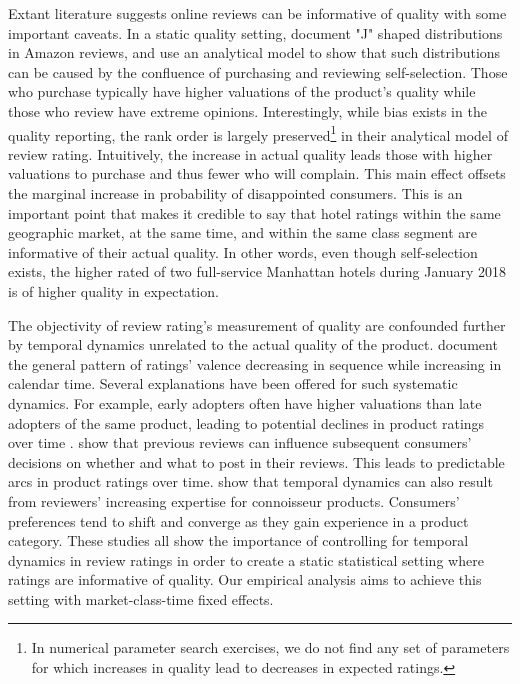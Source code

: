 \documentclass[mksc,blindrev]{informs3} %
\begin{document}
Extant literature suggests online reviews can be informative of quality with some important caveats. In a static quality setting, \citet{hu2006can} document "J" shaped distributions in Amazon reviews, and use an analytical model to show that such distributions can be caused by the confluence of purchasing and reviewing self-selection. Those who purchase typically have higher valuations of the product's quality while those who review have extreme opinions. Interestingly, while bias exists in the quality reporting, the rank order is largely preserved\footnote{In numerical parameter search exercises, we do not find any set of parameters for which increases in quality lead to decreases in expected ratings.} in their analytical model of review rating. Intuitively, the increase in actual quality leads those with higher valuations to purchase and thus fewer who will complain. This main effect offsets the marginal increase in probability of disappointed consumers. This is an important point that makes it credible to say that hotel ratings within the same geographic market, at the same time, and within the same class segment are informative of their actual quality. In other words, even though self-selection exists, the higher rated of two full-service Manhattan hotels during January 2018 is of higher quality in expectation.

The objectivity of review rating's measurement of quality are confounded further by temporal dynamics unrelated to the actual quality of the product. \citet{godes2012sequential} document the general pattern of ratings' valence decreasing in sequence while increasing in calendar time. Several explanations have been offered for such systematic dynamics. For example, early adopters often have higher valuations than late adopters of the same product, leading to potential declines in product ratings over time \citep{li2008self}. \citet{moe2012online} show that previous reviews can influence subsequent consumers' decisions on whether and what to post in their reviews. This leads to predictable arcs in product ratings over time. \citet{mcauley2013amateurs} show that temporal dynamics can also result from reviewers' increasing expertise for connoisseur products. Consumers' preferences tend to shift and converge as they gain experience in a product category. These studies all show the importance of controlling for temporal dynamics in review ratings in order to create a static statistical setting where ratings are informative of quality. Our empirical analysis aims to achieve this setting with market-class-time fixed effects. 
\end{document}
